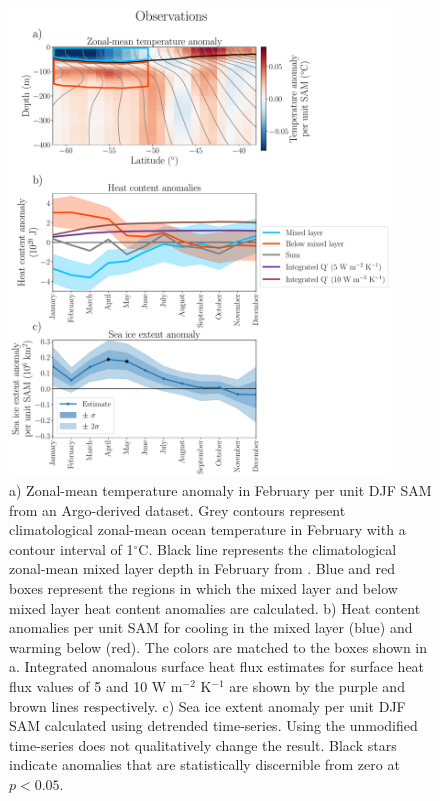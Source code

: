 \documentclass{ametsocV5}
\begin{document}
\begin{figure}[!ht]
    \begin{center}
        \includegraphics[width=0.9\textwidth]{figures/argo_regression_OHC_anomalies_and_time_series.pdf}
        \caption{a) Zonal-mean temperature anomaly in February per unit DJF SAM from an Argo-derived dataset. Grey contours represent climatological zonal-mean ocean temperature in February with a contour interval of 1$^{\circ}$C. Black line represents the climatological zonal-mean mixed layer depth in February from \citet{Holte2017}. Blue and red boxes represent the regions in which the mixed layer and below mixed layer heat content anomalies are calculated.
        b) Heat content anomalies per unit SAM for cooling in the mixed layer (blue) and warming below (red). The colors are matched to the boxes shown in a. Integrated anomalous surface heat flux estimates for surface heat flux values of 5 and 10 W m$^{-2}$ K$^{-1}$ are shown by the purple and brown lines respectively.
        c) Sea ice extent anomaly per unit DJF SAM calculated using detrended time-series. Using the unmodified time-series does not qualitatively change the result. Black stars indicate anomalies that are statistically discernible from zero at $p < 0.05$.}
        \label{fig:argo_regression_OHC_anomalies_and_time_series}
    \end{center}
\end{figure}
\end{document}
